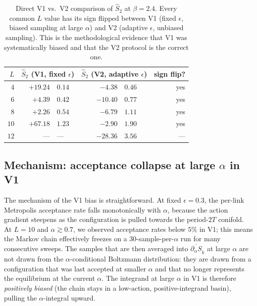 \documentclass[11pt,a4paper]{article}
\theoremstyle{definition}
\begin{document}
\begin{table}[t]
\centering
\begin{tabular}{rr@{$\;\pm\;$}lr@{$\;\pm\;$}lr}
\toprule
$L$ & \multicolumn{2}{c}{$\widehat S_2$ (V1, fixed $\epsilon$)}
    & \multicolumn{2}{c}{$\widehat S_2$ (V2, adaptive $\epsilon$)}
    & sign flip? \\
\midrule
$4$  & $+19.24$ & $0.14$ & $-4.38$  & $0.46$ & yes \\
$6$  & $+4.39$  & $0.42$ & $-10.40$ & $0.77$ & yes \\
$8$  & $+2.26$  & $0.54$ & $-6.79$  & $1.11$ & yes \\
$10$ & $+67.18$ & $1.23$ & $-2.90$  & $1.90$ & yes \\
$12$ & --- & ---     & $-28.36$ & $3.56$ & --- \\
\bottomrule
\end{tabular}
\caption{Direct V1 vs.\ V2 comparison of $\widehat S_2$ at
$\beta = 2.4$. Every common $L$ value has its sign flipped between
V1 (fixed $\epsilon$, biased sampling at large $\alpha$) and V2
(adaptive $\epsilon$, unbiased sampling). This is the methodological
evidence that V1 was systematically biased and that the V2 protocol
is the correct one.}
\label{tab:v1v2-direct}
\end{table}

\subsection{Mechanism: acceptance collapse at large $\alpha$ in V1}

The mechanism of the V1 bias is straightforward. At fixed
$\epsilon = 0.3$, the per-link Metropolis acceptance rate falls
monotonically with $\alpha$, because the action gradient steepens as
the configuration is pulled towards the period-$2T$ conifold. At
$L = 10$ and $\alpha \gtrsim 0.7$, we observed acceptance rates
below $5\%$ in V1; this means the Markov chain effectively freezes
on a $30$-sample-per-$\alpha$ run for many consecutive sweeps. The
samples that are then averaged into
$\overline{\partial_\alpha S}_k$ at large $\alpha$ are not drawn
from the $\alpha$-conditional Boltzmann distribution: they are
drawn from a configuration that was last accepted at smaller
$\alpha$ and that no longer represents the equilibrium at the
current $\alpha$. The integrand at large $\alpha$ in V1 is therefore
\emph{positively biased} (the chain stays in a low-action,
positive-integrand basin), pulling the $\alpha$-integral upward.
\end{document}
